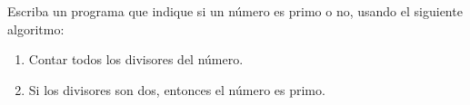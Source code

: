 Escriba un programa que indique
si un número es primo o no,
usando el siguiente algoritmo:
\begin{enumerate}
  \item Contar todos los divisores del número.
  \item Si los divisores son dos,
    entonces el número es primo.
\end{enumerate}

\begin{minipage}[t]{.20\textwidth}
  
\end{minipage}
\quad
\begin{minipage}[t]{.20\textwidth}
  
\end{minipage}
\quad
\begin{minipage}[t]{.20\textwidth}
  
\end{minipage}
